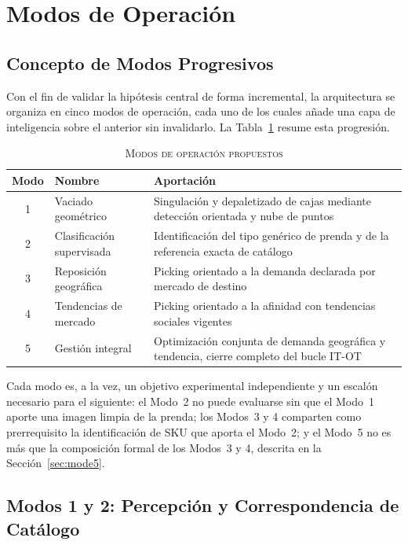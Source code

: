 \documentclass[conference]{IEEEtran}
\begin{document}
\section{Modos de Operación}
\label{sec:modes}

\subsection{Concepto de Modos Progresivos}

Con el fin de validar la hipótesis central de forma incremental, la
arquitectura se organiza en cinco modos de operación, cada uno de los cuales
añade una capa de inteligencia sobre el anterior sin invalidarlo. La
Tabla~\ref{tab:modes} resume esta progresión.

\begin{table}[!t]
\caption{\textsc{Modos de operación propuestos}}
\label{tab:modes}
\centering
\footnotesize
\begin{tabular}{@{}clp{4.6cm}@{}}
\toprule
\textbf{Modo} & \textbf{Nombre} & \textbf{Aportación} \\
\midrule
1 & Vaciado geométrico & Singulación y depaletizado de cajas mediante
  detección orientada y nube de puntos \\
2 & Clasificación supervisada & Identificación del tipo genérico de prenda y
  de la referencia exacta de catálogo \\
3 & Reposición geográfica & Picking orientado a la demanda declarada por
  mercado de destino \\
4 & Tendencias de mercado & Picking orientado a la afinidad con tendencias
  sociales vigentes \\
5 & Gestión integral & Optimización conjunta de demanda geográfica y
  tendencia, cierre completo del bucle IT-OT \\
\bottomrule
\end{tabular}
\end{table}

Cada modo es, a la vez, un objetivo experimental independiente y un
escalón necesario para el siguiente: el Modo~2 no puede evaluarse sin que el
Modo~1 aporte una imagen limpia de la prenda; los Modos~3 y 4 comparten como
prerrequisito la identificación de SKU que aporta el Modo~2; y el Modo~5 no
es más que la composición formal de los Modos~3 y 4, descrita en la
Sección~\ref{sec:mode5}.


\subsection{Modos 1 y 2: Percepción y Correspondencia de Catálogo}
\label{sec:vision}
\end{document}
